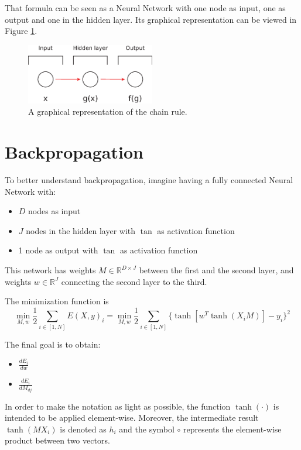 That formula can be seen as a Neural Network with one node as input, one as output and one in the hidden layer.
Its graphical representation can be viewed in Figure \ref{fig:nn-chain}.

\begin{figure}[h]
    \centering
    \includegraphics[width=0.5\textwidth]{images/nn-chain.eps}
    \caption{A graphical representation of the chain rule.}
    \label{fig:nn-chain}
\end{figure}

\section{Backpropagation}
To better understand backpropagation, imagine having a fully connected Neural Network with:
\begin{itemize}
    \item $D$ nodes as input
    \item $J$ nodes in the hidden layer with $\tan$ as activation function
    \item 1 node as output with $\tan$ as activation function
\end{itemize}

This network has weights $M \in \mathbb{R}^{D \times J}$ between the first and the second layer,
and weights $w \in \mathbb{R}^{J} $ connecting the second layer to the third.

The minimization function is
\[\displaystyle \min_{M, w} \frac{1}{2} \sum_{i \in [1, N]} E(X, y)_i =
    \min_{M, w} \frac{1}{2} \sum_{i \in [1, N]} \{ \tanh[w^T \tanh(X_i M)] - y_i\}^2 \]

The final goal is to obtain:
\begin{multicols}{2}
    \begin{itemize}
        \item $\displaystyle \frac{dE_i}{dw}$
        \item $\displaystyle \frac{dE_i}{dM_{dj}}$
    \end{itemize}
\end{multicols}

In order to make the notation as light as possible, the function $\tanh(\cdot)$ is intended to be applied element-wise.
Moreover, the intermediate result $\tanh(M X_i)$ is denoted as $h_i$ and the symbol $\circ$ represents the element-wise product between two vectors.

